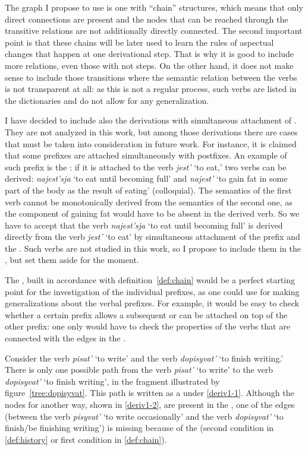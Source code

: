 The graph I propose to use is one with ``chain'' structures, which means that only direct connections are present and the nodes that can be reached through the transitive relations are not additionally directly connected. The second important point is that these chains will be later used to learn the rules of aspectual changes that happen at one derivational step. That is why it is good to include more relations, even those with not  steps. On the other hand, it does not make sense to include those transitions where the semantic relation between the verbs is not transparent at all: as this is not a regular process, such verbs are listed in the dictionaries and do not allow for any generalization. 

I have decided to include also the derivations with simultaneous attachment of . They are not analyzed in this work, but among those derivations there are cases that must be taken into consideration in future work. For instance, it is claimed that some prefixes are attached simultaneously with postfixes. An example of such prefix is the  : if it is attached to the verb \textit{jest'} `to eat,' two verbs can be derived: \textit{najest'sja} `to eat until becoming full' and \textit{najest'} `to gain fat in some part of the body as the result of eating' (colloquial). The semantics of the first verb cannot be  monotonically derived from the semantics of the second one, as the component of gaining fat would have to be absent in the derived verb. So we have to accept that the verb \textit{najest'sja} `to eat until becoming full' is derived directly from the verb \textit{jest'} `to eat' by simultaneous attachment of the prefix and the . Such verbs are not studied in this work, so I propose to include them in the , but set them aside for the moment.
 
The , built in accordance with definition~\ref{def:chain} would be a perfect starting point for the investigation of the individual prefixes, as one could use  for making generalizations about the verbal prefixes. For example, it would be easy to check whether a certain prefix allows a subsequent  or can be attached on top of the other prefix: one only would have to check the properties of the verbs that are connected with the edges in the . 

Consider the verb {\it pisat'} `to write' and the verb {\it dopisyvat'} `to finish writing.' There is only one possible path from the verb {\it pisat'} `to write' to the verb {\it dopisyvat'} `to finish writing', in the  fragment illustrated by figure~\ref{tree:dopisyvat}. This path is written as a  under \ref{deriv1-1}. Although the nodes for another way, shown in \ref{deriv1-2}, are present in the , one of the edges (between the verb \textit{pisyvat'} `to write occasionally' and the verb \textit{dopisyvat'} `to finish/be finishing writing') is missing because of the  (second condition in \ref{def:history} or first condition in \ref{def:chain}).

